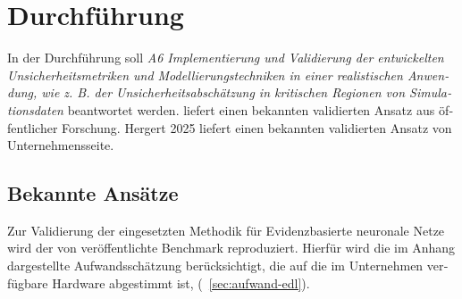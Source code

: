 
\chapter{Durchführung}\label{chapter:durchfuehrung}



\begin{otherlanguage}{american}
  
\end{otherlanguage}



\begin{otherlanguage}{ngerman}

In der Durchführung soll \textit{A6 Implementierung und Validierung der entwickelten Unsicherheitsmetriken
und Modellierungstechniken in einer realistischen Anwendung, wie z. B. der
Unsicherheitsabschätzung in kritischen Regionen von Simulationsdaten} beantwortet werden. \parencite{amini2020deep} liefert einen bekannten validierten Ansatz aus öffentlicher Forschung. Hergert 2025 liefert einen bekannten validierten Ansatz von Unternehmensseite. 

\section*{Bekannte Ansätze}

Zur Validierung der eingesetzten Methodik für \gls{Evidenzbasierte neuronale Netze} wird der von \parencite{amini2020deep} veröffentlichte Benchmark reproduziert. Hierfür wird die im Anhang dargestellte Aufwandsschätzung berücksichtigt, die auf die im Unternehmen verfügbare Hardware abgestimmt ist, (~\ref{sec:aufwand-edl}).


\end{otherlanguage}
